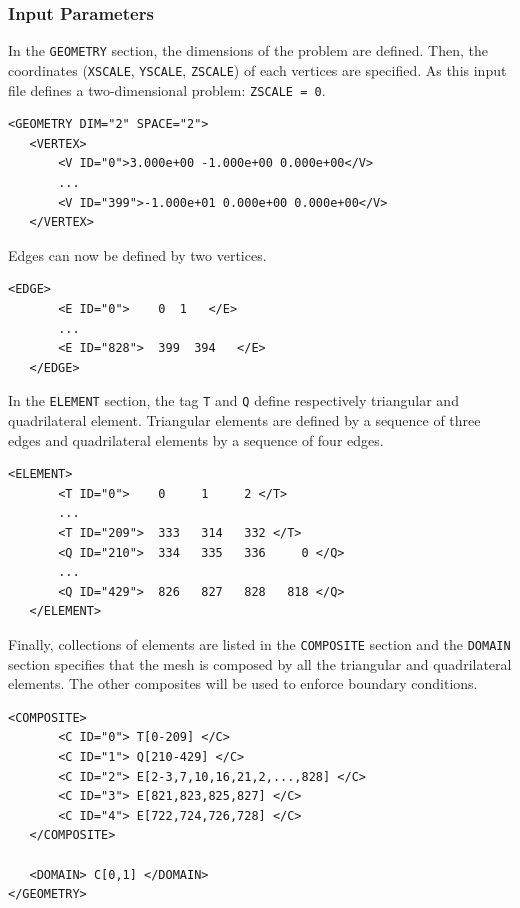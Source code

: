\subsubsection{Input Parameters}

In the \texttt{GEOMETRY} section, the dimensions of the problem are defined. Then, the coordinates (\texttt{XSCALE}, \texttt{YSCALE}, \texttt{ZSCALE}) of each vertices are specified. As this input file defines a two-dimensional problem: \texttt{ZSCALE = 0}.

      \begin{lstlisting}[style=XMLStyle]
<GEOMETRY DIM="2" SPACE="2">
   <VERTEX>
       <V ID="0">3.000e+00 -1.000e+00 0.000e+00</V>
       ...
       <V ID="399">-1.000e+01 0.000e+00 0.000e+00</V>
   </VERTEX>
     \end{lstlisting}

Edges can now be defined by two vertices.

      \begin{lstlisting}[style=XMLStyle]
<EDGE>
       <E ID="0">    0  1   </E>
       ...
       <E ID="828">  399  394   </E>
   </EDGE>
        \end{lstlisting}

In the \texttt{ELEMENT} section, the tag \texttt{T} and \texttt{Q} define respectively triangular and quadrilateral element. Triangular elements are defined by a sequence of three edges and quadrilateral elements by a sequence of four edges.

      \begin{lstlisting}[style=XMLStyle]
<ELEMENT>
       <T ID="0">    0     1     2 </T>
       ...
       <T ID="209">  333   314   332 </T>
       <Q ID="210">  334   335   336     0 </Q>
       ...
       <Q ID="429">  826   827   828   818 </Q>
   </ELEMENT>
        \end{lstlisting}

Finally, collections of elements are listed in the \texttt{COMPOSITE} section and the \texttt{DOMAIN} section specifies that the mesh is composed by all the triangular and quadrilateral elements. The other composites will be used to enforce boundary conditions.

      \begin{lstlisting}[style=XMLStyle]
<COMPOSITE>
       <C ID="0"> T[0-209] </C>
       <C ID="1"> Q[210-429] </C>
       <C ID="2"> E[2-3,7,10,16,21,2,...,828] </C>
       <C ID="3"> E[821,823,825,827] </C>
       <C ID="4"> E[722,724,726,728] </C>
   </COMPOSITE>

   <DOMAIN> C[0,1] </DOMAIN>
</GEOMETRY>
        \end{lstlisting}

